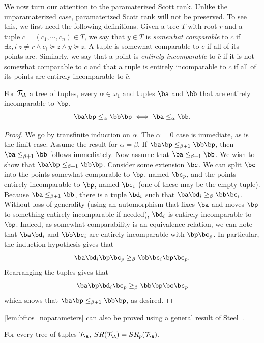 \documentclass{amsart}
\newcommand{\T}{{\mathcal{T}}}
\newcommand{\SR}{SR}
\begin{document}
We now turn our attention to the paramaterized Scott rank.
Unlike the unparamaterized case, paramaterized Scott rank will not be preserved.
To see this, we first need the following definitions. 
Given a tree $T$ with root $r$ and a tuple $\bar{c}=(c_1,\cdots,c_n)\in T$, we
say that $y\in T$ is \textit{somewhat comparable} to $\bar{c}$ if $\exists z,i ~
z\neq r\land c_i\succeq z \land y\succeq z$.
A tuple is somewhat comparable to $\bar{c}$ if all of its points are.
Similarly, we say that a point is \textit{entirely incomparable} to $\bar{c}$ if it is not somewhat comparable to $\bar{c}$ and that a tuple is entirely incomparable to $\bar{c}$ if all of its points are entirely incomparable to $\bar{c}$.

\begin{lemma}\label{lem:bftos_noparameters}
For $\T_\A$ a tree of tuples, every $\alpha\in\omega_1$ and tuples $\ba$ and $\bb$ that are entirely incomparable to $\bp$,
\[\ba\bp\leq_\alpha\bb\bp \iff \ba\leq_\alpha\bb.\]
\end{lemma}
\begin{proof}
We go by transfinite induction on $\alpha$.
The $\alpha=0$ case is immediate, as is the limit case.
Assume the result for $\alpha=\beta$.
If $\ba\bp\leq_{\beta+1}\bb\bp$, then $\ba\leq_{\beta+1}\bb$ follows immediately.
Now assume that $\ba\leq_{\beta+1}\bb$.
We wish to show that $\ba\bp\leq_{\beta+1}\bb\bp$.
Consider some extension $\bc$.
We can split $\bc$ into the points somewhat comparable to $\bp$, named $\bc_p$, and the points entirely incomparable to $\bp$, named $\bc_i$ (one of these may be the empty tuple).
Because $\ba\leq_{\beta+1}\bb$, there is a tuple $\bd_i$ such that $\ba\bd_i\geq_{\beta}\bb\bc_i$.
Without loss of generality (using an automorphism that fixes $\ba$ and moves $\bp$ to something entirely incomparable if needed), $\bd_i$ is entirely incomparable to $\bp$. 
Indeed, as somewhat comparability is an equivalence relation, we can note that $\ba\bd_i$ and $\bb\bc_i$ are entirely incomparable with $\bp\bc_p$.
In particular, the induction hypothesis gives that
\[\ba\bd_i\bp\bc_p\geq_{\beta}\bb\bc_i\bp\bc_p.\]
Rearranging the tuples gives that
\[\ba\bp\bd_i\bc_p\geq_{\beta}\bb\bp\bc\bc_p\]
which shows that $\ba\bp\leq_{\beta+1}\bb\bp$, as desired.
\end{proof}
\cref{lem:bftos_noparameters} can also be proved using a general result of
Steel~\cite{steel1978}.
\begin{lemma}
For every tree of tuples $\T_\A$, $\SR(\T_\A)=\SR_p(\T_\A)$.
\end{lemma}
\end{document}
